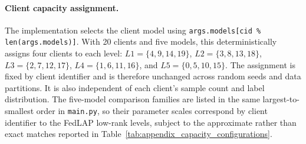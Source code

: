 \paragraph{Client capacity assignment.}
The implementation selects the client model using
\texttt{args.models[cid \% len(args.models)]}.  With 20 clients and five
models, this deterministically assigns four clients to each level:
$L1=\{4,9,14,19\}$, $L2=\{3,8,13,18\}$,
$L3=\{2,7,12,17\}$, $L4=\{1,6,11,16\}$, and
$L5=\{0,5,10,15\}$.  The assignment is fixed by client identifier and is
therefore unchanged across random seeds and data partitions.  It is also
independent of each client's sample count and label distribution.  The
five-model comparison families are listed in the same largest-to-smallest
order in \texttt{main.py}, so their parameter scales correspond by client
identifier to the FedLAP low-rank levels, subject to the approximate rather
than exact matches reported in Table~\ref{tab:appendix_capacity_configurations}.

